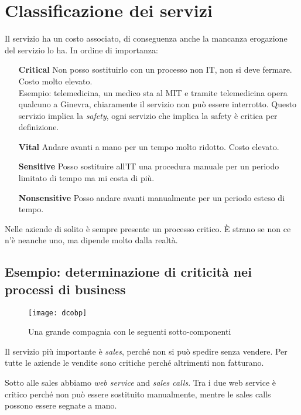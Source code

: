 \section{Classificazione dei servizi}

Il servizio ha un costo associato, di conseguenza anche la mancanza erogazione 
del servizio lo ha. In ordine di importanza:
\begin{enumerate}
 \item[\textbf{Critical}] Non posso sostituirlo con un processo non IT, non si 
deve fermare. Costo molto elevato. \\
Esempio: telemedicina, un medico sta al MIT 
e tramite telemedicina opera qualcuno a Ginevra, chiaramente il servizio non 
può essere interrotto. Questo servizio implica la \textit{safety}, ogni 
servizio che implica la safety è critica per definizione.

 \item[\textbf{Vital}] Andare avanti a mano per un tempo molto ridotto. Costo 
elevato.

 \item[\textbf{Sensitive}] Posso sostituire all'IT una procedura manuale per un 
periodo limitato di tempo ma mi costa di più. 

 \item[\textbf{Nonsensitive}] Posso andare avanti manualmente per un periodo 
esteso di tempo. 

\end{enumerate}

Nelle aziende di solito è sempre presente un processo critico. È strano se non 
ce n'è neanche uno, ma dipende molto dalla realtà.

\subsection{Esempio: determinazione di criticità nei processi di business}

\begin{figure}[H]
 \centering
 \texttt{[image: dcobp]}
 \caption{Una grande compagnia con le seguenti sotto-componenti}
\end{figure}

Il servizio più importante è \textit{sales}, perché non si può spedire senza 
vendere. Per tutte le aziende le vendite sono critiche perché altrimenti non 
fatturano.

Sotto alle sales abbiamo \textit{web service} and \textit{sales calls}. Tra i 
due web service è critico perché non può essere sostituito manualmente, mentre 
le sales calls possono essere segnate a mano.

